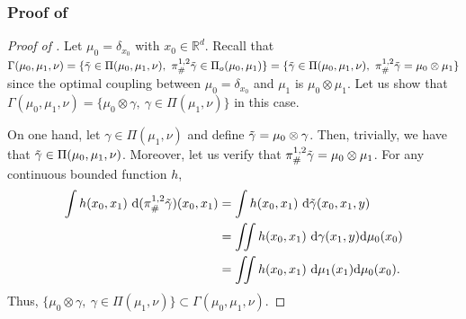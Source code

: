 \documentclass[twoside]{article}
\begin{document}
\subsubsection{Proof of } \label{proof:corollary_busemann_dirac}


\begin{proof}[Proof of ]
    Let $\mu_0=\delta_{x_0}$ with $x_0\in\mathbb{R}^d$. Recall that $\Gamma(\mu_0, \mu_1, \nu) = \{\Tilde{\gamma}\in\Pi(\mu_0,\mu_1,\nu),\ \pi^{1,2}_\#\Tilde{\gamma}\in\Pi_o(\mu_0,\mu_1)\} = \{\Tilde{\gamma}\in\Pi(\mu_0,\mu_1,\nu),\ \pi^{1,2}_\#\Tilde{\gamma}=\mu_0\otimes \mu_1\}$ since the optimal coupling between $\mu_0=\delta_{x_0}$ and $\mu_1$ is $\mu_0\otimes \mu_1$. Let us show that $\Gamma(\mu_0,\mu_1,\nu) = \{\mu_0 \otimes \gamma,\ \gamma\in\Pi(\mu_1,\nu)\}$ in this case.

    On one hand, let $\gamma\in\Pi(\mu_1,\nu)$ and define $\Tilde{\gamma}=\mu_0\otimes \gamma$. Then, trivially, we have that $\Tilde{\gamma}\in\Pi(\mu_0,\mu_1,\nu)$. Moreover, let us verify that $\pi^{1,2}_\#\Tilde{\gamma}=\mu_0\otimes \mu_1$. For any continuous bounded function $h$,
    \begin{equation}
        \begin{aligned}
            \int h(x_0,x_1)\ \mathrm{d}(\pi^{1,2}_\#\Tilde{\gamma})(x_0,x_1) &= \int h(x_0,x_1)\ \mathrm{d}\Tilde{\gamma}(x_0,x_1,y) \\
            &= \iint h(x_0,x_1)\ \mathrm{d}\gamma(x_1, y)\mathrm{d}\mu_0(x_0) \\
            &=  \iint h(x_0,x_1)\ \mathrm{d}\mu_1(x_1)\mathrm{d}\mu_0(x_0).
        \end{aligned}
    \end{equation}
    Thus, $\{\mu_0\otimes \gamma,\ \gamma\in\Pi(\mu_1,\nu)\}\subset \Gamma(\mu_0,\mu_1,\nu)$.


\end{proof}
\end{document}
